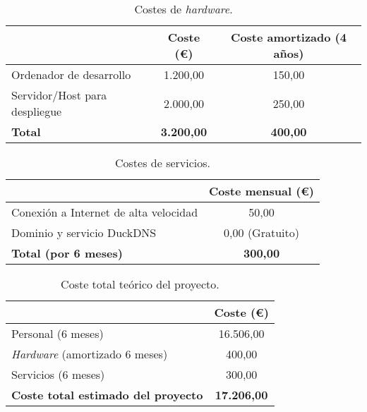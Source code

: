 \begin{table}[H]
    \centering
    \begin{tabular}{lcc}
        \hline
        \rowcolor[HTML]{EFEFEF} 
        \multicolumn{1}{c}{\cellcolor[HTML]{EFEFEF}\textbf{Concepto}} & \textbf{Coste (€)} & \textbf{Coste amortizado (4 años)} \\ \hline
        \rowcolor[HTML]{ECF4FF} 
        Ordenador de desarrollo & 1.200,00 & 150,00 \\
        \rowcolor[HTML]{EFEFEF} 
        Servidor/Host para despliegue & 2.000,00 & 250,00 \\ \hline
        \rowcolor[HTML]{ECF4FF} 
        \textbf{Total} & \textbf{3.200,00} & \textbf{400,00} \\ \hline
    \end{tabular}
    \caption{Costes de \textit{hardware}.}
    \label{tablaA2}
\end{table}

\begin{table}[H]
    \centering
    \begin{tabular}{lc}
        \hline
        \rowcolor[HTML]{EFEFEF} 
        \multicolumn{1}{c}{\cellcolor[HTML]{EFEFEF}\textbf{Concepto}} & \textbf{Coste mensual (€)} \\ \hline
        \rowcolor[HTML]{ECF4FF} 
        Conexión a Internet de alta velocidad & 50,00 \\
        \rowcolor[HTML]{EFEFEF} 
        Dominio y servicio DuckDNS & 0,00 (Gratuito) \\ \hline
        \rowcolor[HTML]{ECF4FF} 
        \textbf{Total (por 6 meses)} & \textbf{300,00} \\ \hline
    \end{tabular}
    \caption{Costes de servicios.}
    \label{tablaA3}
\end{table}

\begin{table}[H]
    \centering
    \begin{tabular}{lc}
        \hline
        \rowcolor[HTML]{EFEFEF} 
        \multicolumn{1}{c}{\cellcolor[HTML]{EFEFEF}\textbf{Concepto}} & \textbf{Coste (€)} \\ \hline
        \rowcolor[HTML]{ECF4FF} 
        Personal (6 meses) & 16.506,00 \\
        \rowcolor[HTML]{EFEFEF} 
        \textit{Hardware} (amortizado 6 meses) & 400,00 \\
        \rowcolor[HTML]{ECF4FF} 
        Servicios (6 meses) & 300,00 \\ \hline
        \rowcolor[HTML]{EFEFEF} 
        \textbf{Coste total estimado del proyecto} & \textbf{17.206,00} \\ \hline
    \end{tabular}
    \caption{Coste total teórico del proyecto.}
    \label{tablaA4}
\end{table}

